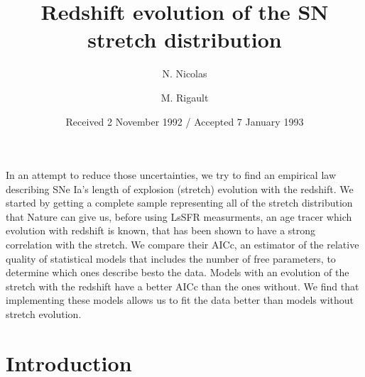 \documentclass{aa}
\begin{document}
\title{Redshift evolution of the SN stretch distribution}


\author{N. Nicolas
    \and M. Rigault
}



\date{Received 2 November 1992 / Accepted 7 January 1993}

    {In an attempt to reduce those uncertainties, we try to find an empirical
    law describing SNe Ia's length of explosion (stretch) evolution with the
redshift.}
    {We started by getting a complete sample representing all of the stretch
        distribution that Nature can give us, before using LsSFR measurments, an
        age tracer which evolution with redshift is known, that has been shown
        to have a strong correlation with the stretch. We compare their AICc, an
    estimator of the relative quality of statistical models that includes the
number of free parameters, to determine which ones describe besto the data.}
    {Models with an evolution of the stretch with the redshift have a better
    AICc than the ones without.}
    {We find that implementing these models allows us to fit the data better
    than models without stretch evolution.}

\maketitle

\section{Introduction}
\end{document}
